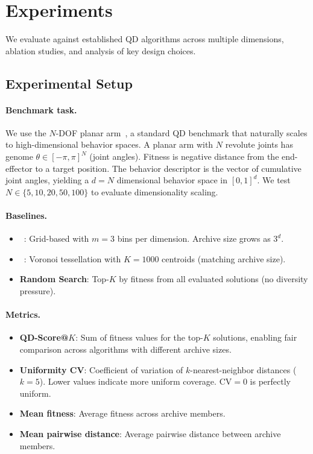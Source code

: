 \section{Experiments}
\label{sec:experiments}

We evaluate \mmr against established QD algorithms across multiple dimensions, ablation studies, and analysis of key design choices.

\subsection{Experimental Setup}
\label{sec:setup}

\paragraph{Benchmark task.}
We use the $N$-DOF planar arm~\cite{cully2015robots}, a standard QD benchmark that naturally scales to high-dimensional behavior spaces.
A planar arm with $N$ revolute joints has genome $\theta \in [-\pi, \pi]^N$ (joint angles).
Fitness is negative distance from the end-effector to a target position.
The behavior descriptor is the vector of cumulative joint angles, yielding a $d = N$ dimensional behavior space in $[0, 1]^d$.
We test $N \in \{5, 10, 20, 50, 100\}$ to evaluate dimensionality scaling.

\paragraph{Baselines.}
\begin{itemize}
    \item \map~\cite{mouret2015illuminating}: Grid-based with $m = 3$ bins per dimension. Archive size grows as $3^d$.
    \item \cvt~\cite{vassiliades2018using}: Voronoi tessellation with $K = 1000$ centroids (matching \mmr archive size).
    \item \textbf{Random Search}: Top-$K$ by fitness from all evaluated solutions (no diversity pressure).
\end{itemize}

\paragraph{Metrics.}
\begin{itemize}
    \item \textbf{QD-Score@$K$}: Sum of fitness values for the top-$K$ solutions, enabling fair comparison across algorithms with different archive sizes.
    \item \textbf{Uniformity CV}: Coefficient of variation of $k$-nearest-neighbor distances ($k = 5$). Lower values indicate more uniform coverage. $\text{CV} = 0$ is perfectly uniform.
    \item \textbf{Mean fitness}: Average fitness across archive members.
    \item \textbf{Mean pairwise distance}: Average pairwise distance between archive members.
\end{itemize}

